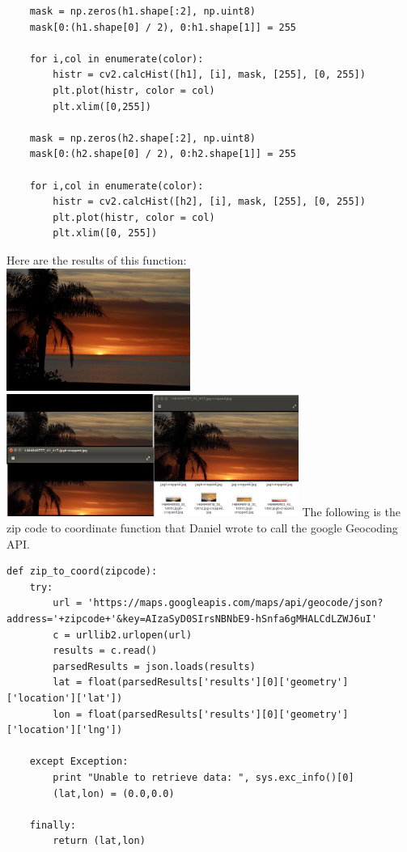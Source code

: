 \documentclass[onecolumn, draftclsnofoot,10pt, compsoc]{IEEEtran}
\begin{document}
\begin{singlespace}
\begin{lstlisting}
	mask = np.zeros(h1.shape[:2], np.uint8)
	mask[0:(h1.shape[0] / 2), 0:h1.shape[1]] = 255

	for i,col in enumerate(color):
		histr = cv2.calcHist([h1], [i], mask, [255], [0, 255])
		plt.plot(histr, color = col)
		plt.xlim([0,255])

	mask = np.zeros(h2.shape[:2], np.uint8)
	mask[0:(h2.shape[0] / 2), 0:h2.shape[1]] = 255

	for i,col in enumerate(color):
		histr = cv2.calcHist([h2], [i], mask, [255], [0, 255])
		plt.plot(histr, color = col)
		plt.xlim([0, 255])
			\end{lstlisting}	
			Here are the results of this function:\\
			\includegraphics[height=4cm,natwidth=640,natheight=426]{images/horizon_uncropped.jpg}
			\includegraphics[height=4cm,natwidth=1281,natheight=537]{images/horizon_cropped.png}
			The following is the zip code to coordinate function that Daniel wrote to call the google Geocoding API.
			\begin{lstlisting}
def zip_to_coord(zipcode):
    try:
        url = 'https://maps.googleapis.com/maps/api/geocode/json?address='+zipcode+'&key=AIzaSyD0SIrsNBNbE9-hSnfa6gMHALCdLZWJ6uI'
        c = urllib2.urlopen(url)
        results = c.read()
        parsedResults = json.loads(results)
        lat = float(parsedResults['results'][0]['geometry']['location']['lat'])
        lon = float(parsedResults['results'][0]['geometry']['location']['lng'])

    except Exception:
        print "Unable to retrieve data: ", sys.exc_info()[0]
        (lat,lon) = (0.0,0.0)

    finally:
        return (lat,lon)
			\end{lstlisting}
\end{singlespace}
\end{document}
